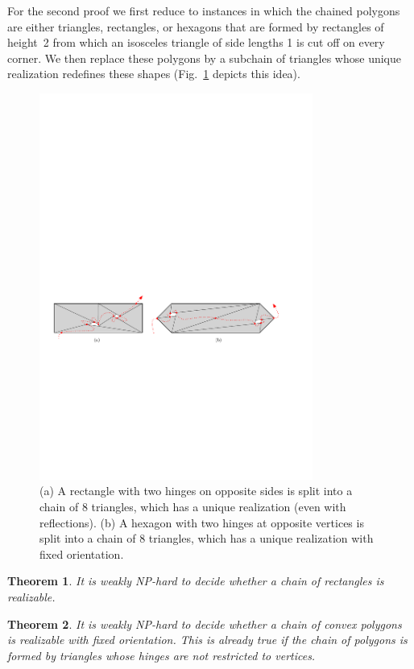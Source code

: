 \documentclass{article}
\theoremstyle{plain}%
\newtheorem{theorem}{Theorem}
\begin{document}
For the second proof we first reduce to instances in which the chained polygons are either triangles, rectangles, or hexagons
that are formed by rectangles of height~2 from which an isosceles triangle of side lengths 1 is cut off on every corner.
We then replace these polygons by a subchain of triangles whose unique realization redefines these shapes (Fig.~\ref{fig:triangles} depicts this idea).
\begin{figure}[htbp]
  \centering
 \includegraphics[width=0.8\textwidth]{fig-triangles}
\caption{(a) A rectangle with two hinges on opposite sides is split into a chain of 8 triangles, which has a unique realization (even with reflections).
(b) A hexagon with two hinges at opposite vertices is split into a chain of 8 triangles,
which has a unique realization with fixed orientation.}
\label{fig:triangles}
\end{figure}

\begin{theorem}\label{thm:path1}
It is weakly NP-hard to decide whether a chain of rectangles is realizable.
\end{theorem}

\begin{theorem}\label{thm:path2}
It is weakly NP-hard to decide whether a chain of convex polygons is realizable with fixed orientation. This is already true if the chain of polygons is formed by triangles whose hinges are not restricted to vertices.
\end{theorem}
\end{document}
